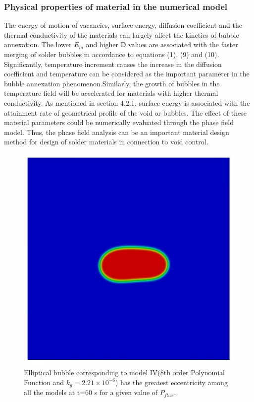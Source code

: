 \documentclass[10pt,a4paper]{article}
\begin{document}
\subsubsection{Physical properties of material in the numerical model}
The energy of motion of vacancies, surface energy, diffusion coefficient and the thermal conductivity of the materials can largely affect the kinetics of bubble annexation. The lower $E_m$ and higher D values are associated with the faster merging of solder bubbles in accordance to equations (1), (9) and (10).  Significantly, temperature increment causes the increase in the diffusion coefficient and temperature can be considered as the important parameter in the bubble annexation phenomenon.Similarly, the growth of bubbles in the temperature field will be accelerated for materials with higher thermal conductivity. As mentioned in section 4.2.1, surface energy is associated with the attainment rate of geometrical profile of the void or bubbles. The effect of these material parameters could be numerically evaluated through the phase field model. Thus, the phase field analysis can be an important material design method for design of solder materials in connection to void control.
\begin{figure}
\caption{Elliptical bubble corresponding to model IV(8th order Polynomial Function and $k_g = 2.21 \times 10 ^{-6}$) has the greatest eccentricity among all the models at t=60 s for a given value of $P_{flux}$.}
\centering
	\includegraphics[scale=0.5]{poly8iw33t60}
\end{figure}
\end{document}
